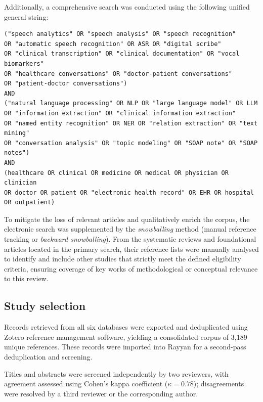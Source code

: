 \documentclass[review,12pt]{elsarticle}
\begin{document}
Additionally, a comprehensive search was conducted using the following
unified general string:

\begin{verbatim}
("speech analytics" OR "speech analysis" OR "speech recognition"
OR "automatic speech recognition" OR ASR OR "digital scribe"
OR "clinical transcription" OR "clinical documentation" OR "vocal biomarkers"
OR "healthcare conversations" OR "doctor-patient conversations"
OR "patient-doctor conversations")
AND
("natural language processing" OR NLP OR "large language model" OR LLM
OR "information extraction" OR "clinical information extraction"
OR "named entity recognition" OR NER OR "relation extraction" OR "text mining"
OR "conversation analysis" OR "topic modeling" OR "SOAP note" OR "SOAP notes")
AND
(healthcare OR clinical OR medicine OR medical OR physician OR clinician
OR doctor OR patient OR "electronic health record" OR EHR OR hospital
OR outpatient)
\end{verbatim}

To mitigate the loss of relevant articles and qualitatively enrich the corpus,
the electronic search was supplemented by the \textit{snowballing} method
(manual reference tracking or \textit{backward snowballing}). From the
systematic reviews and foundational articles located in the primary search,
their reference lists were manually analysed to identify and include other
studies that strictly meet the defined eligibility criteria, ensuring coverage
of key works of methodological or conceptual relevance to this review.

\subsection{Study selection}

Records retrieved from all six databases were exported and deduplicated
using Zotero reference management software, yielding a consolidated corpus
of 3,189 unique references. These records were imported into Rayyan
\citep{Ouzzani2016} for a second-pass deduplication and screening.

Titles and abstracts were screened independently by two reviewers, with
agreement assessed using Cohen's kappa coefficient ($\kappa = 0.78$);
disagreements were resolved by a third reviewer or the corresponding author.
\end{document}
